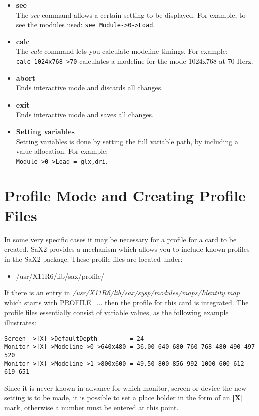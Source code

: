 \begin{appendix}
\begin{itemize}
\item  \textbf{see}\\
       The \textit{see} command allows a certain setting to be displayed. For
       example, to see the modules used: 
       \verb+see Module->0->Load+.

\item  \textbf{calc}\\
       The \textit{calc} command lets you calculate modeline timings. For
       example:\\
       \verb+calc 1024x768->70+ calculates a modeline for the mode
       1024x768 at 70 Herz.

\item  \textbf{abort}\\
       Ends interactive mode and discards all changes.

\item  \textbf{exit}\\
       Ends interactive mode and saves all changes.

\item  \textbf{Setting variables}\\
       Setting variables is done by setting the full variable path, by
       including a value allocation. For example:\\
       \verb+Module->0->Load = glx,dri+.
\end{itemize}

\section{Profile Mode and Creating Profile Files}
In some very specific cases it may be necessary for a profile for a card to be
created. SaX2 provides a mechanism which allows you to include known profiles
in the SaX2 package. These profile files are located under:\\
\begin{itemize}
\item /usr/X11R6/lib/sax/profile/
\end{itemize}
If there is an entry in
\textit{/usr/X11R6/lib/sax/sysp/modules/maps/Identity.map} 
which starts with PROFILE=... then the profile for this card is
integrated. The profile files essentially consist of variable values, as the
following example illustrates:
\begin{verbatim}
Screen ->[X]->DefaultDepth         = 24
Monitor->[X]->Modeline->0->640x480 = 36.00 640 680 760 768 480 490 497 520
Monitor->[X]->Modeline->1->800x600 = 49.50 800 856 992 1000 600 612 619 651
\end{verbatim}
Since it is never known in advance for which monitor, screen or device the new
setting is to be made, it is possible to set a place holder in the form of an  
\textbf{[X]} mark, otherwise a number must be entered at this point. 



\end{appendix}

